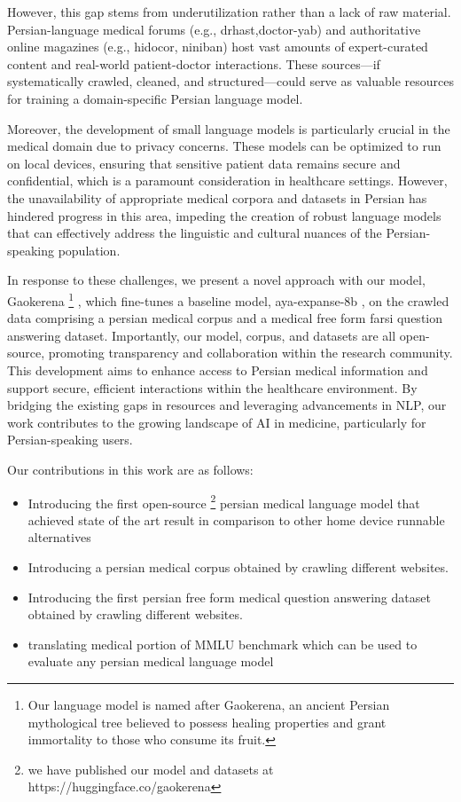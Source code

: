 \documentclass[conference]{IEEEtran}
\begin{document}
	However, this gap stems from underutilization rather than a lack of raw material. Persian-language medical forums (e.g., drhast,doctor-yab) and authoritative online magazines (e.g., hidocor, niniban) host vast amounts of expert-curated content and real-world patient-doctor interactions. These sources—if systematically crawled, cleaned, and structured—could serve as valuable resources for training a domain-specific Persian language model.
	
	Moreover, the development of small language models is particularly crucial in the medical domain due to privacy concerns. These models can be optimized to run on local devices, ensuring that sensitive patient data remains secure and confidential, which is a paramount consideration in healthcare settings. However, the unavailability of appropriate medical corpora and datasets in Persian has hindered progress in this area, impeding the creation of robust language models that can effectively address the linguistic and cultural nuances of the Persian-speaking population.
	
	In response to these challenges, we present a novel approach with our model, Gaokerena
	\footnote{
		Our language model is named after Gaokerena, an ancient Persian mythological tree believed to possess healing properties and grant immortality to those who consume its fruit.
	}
	, which fine-tunes a baseline model, aya-expanse-8b
	\cite{b5}
	, on the crawled data comprising a persian medical corpus and a medical free form farsi question answering dataset. Importantly, our model, corpus, and datasets are all open-source, promoting transparency and collaboration within the research community. This development aims to enhance access to Persian medical information and support secure, efficient interactions within the healthcare environment. By bridging the existing gaps in resources and leveraging advancements in NLP, our work contributes to the growing landscape of AI in medicine, particularly for Persian-speaking users.
	
	Our contributions in this work are as follows:
	\begin{itemize}
		\item Introducing the first open-source
		\footnote{
			we have published our model and datasets at https://huggingface.co/gaokerena
		}
		persian medical language model that achieved state of the art result in
		comparison to other home device runnable alternatives
		\item Introducing a persian medical corpus obtained by crawling different websites.
		\item  Introducing the first persian free form medical question answering dataset obtained by crawling different websites.
		\item translating medical portion of MMLU benchmark which can be used to evaluate any persian medical language model
	\end{itemize}
	
\end{document}
